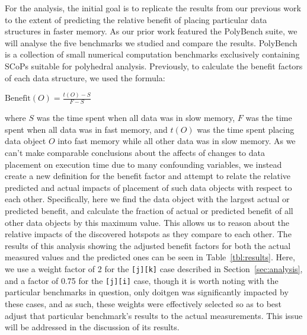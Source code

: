 For the analysis, the initial goal is to replicate the results from our previous work to the extent of predicting the relative benefit of placing particular data structures in faster memory.
As our prior work featured the PolyBench suite\cite{polybench}, we will analyse the five benchmarks we studied and compare the results.
PolyBench is a collection of small numerical computation benchmarks exclusively containing \acp{SCoP} suitable for polyhedral analysis.
Previously, to calculate the benefit factors of each data structure, we used the formula:
\begin{center}
$\text{Benefit}(O) = \frac{t(O) - S}{F - S}$
\end{center}
where $S$ was the time spent when all data was in slow memory, $F$ was the time spent when all data was in fast memory, and $t(O)$ was the time spent placing data object $O$ into fast memory while all other data was in slow memory.
As we can't make comparable conclusions about the affects of changes to data placement on execution time due to many confounding variables, we instead create a new definition for the benefit factor and attempt to relate the relative predicted and actual impacts of placement of such data objects with respect to each other.
Specifically, here we find the data object with the largest actual or predicted benefit, and calculate the fraction of actual or predicted benefit of all other data objects by this maximum value.
This allows us to reason about the relative impacts of the discovered hotspots as they compare to each other.
The results of this analysis showing the adjusted benefit factors for both the actual measured values and the predicted ones can be seen in Table~\ref{tbl:results}.
Here, we use a weight factor of 2 for the \texttt{[j][k]} case described in Section~\ref{sec:analysis}, and a factor of 0.75 for the \texttt{[j][i]} case, though it is worth noting with the particular benchmarks in question, only doitgen was significantly impacted by these cases, and as such, these weights were effectively selected so as to best adjust that particular benchmark's results to the actual measurements.
This issue will be addressed in the discussion of its results.

